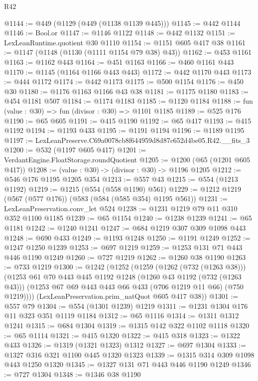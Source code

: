 \begin{lexlean}{R42}
\begin{coremodule}
@1144 := @449 (@1129 (@449 (@1138 @1139 @445)))
@1145 := @442 @1144
@1146 := Bool.or
@1147 := @1146 @1122
@1148 := @442 @1132
@1151 := LexLeanRuntime.quotient @30 @1110
@1154 := @1151 @605 @417 @38
@1161 := @1147 (@1148 (@1130 (@1111 @1154 @79 @38) @43))
@1162 := @453 @1161
@1163 := @1162 @443
@1164 := @451 @1163
@1166 := @460 @1161 @443
@1170 := @1145 (@1164 @1166 @443 @443)
@1172 := @442 @1170 @443
@1173 := @444 @1172
@1174 := @442 @1173
@1175 := @500 @1154
@1176 := @450 @30
@1180 := @1176 @1163 @1166 @43 @38
@1181 := @1175 @1180
@1183 := @454 @1181 @507
@1184 := @1174 @1183
@1185 := @1120 @1184
@1188 := fun (value : @30) => fun (divisor : @30) => @1101 @1185
@1189 := @525 @176
@1190 := @65 @605
@1191 := @415 @1190
@1192 := @65 @417
@1193 := @415 @1192
@1194 := @1193 @433
@1195 := @1191 @1194
@1196 := @1189 @1195
@1197 := LexLeanPreserve.C69a0078cb8f644959d8d87c652d4be05.R42.__fits_3
@1200 := @532 (@1197 @605 @417)
@1201 := VerdantEngine.FloatStorage.roundQuotient
@1205 := @1200 (@65 (@1201 @605 @417))
@1208 := (value : @30) -> (divisor : @30) -> @1196 @1205
@1212 := @546 @176 @1195 @1205 @354
@1213 := @557 @43
@1215 := @554 (@1213 @1192)
@1219 := @1215 (@554 (@558 @1190) @561)
@1229 := @1212 @1219 (@567 (@577 @176)) (@583 (@584 (@585 @354) @1195 @561))
@1231 := LexLeanPreservation.conv_let @524
@1238 := @1231 @1219 @79 @11 @310 @352 @1100 @1185
@1239 := @65 @1154
@1240 := @1238 @1239
@1241 := @65 @1181
@1242 := @1240 @1241
@1247 := @684 @1219 @307 @309 @1098 @443
@1248 := @690 @433
@1249 := @1193 @1248
@1250 := @1191 @1249
@1252 := @1247 @1250 @1239
@1253 := @697 @1219
@1259 := @1253 @131 @71 @443 @446 @1190 @1249
@1260 := @727 @1219
@1262 := @1260 @38 @1190
@1263 := @733 @1219
@1300 := @1242
    (@1252
      (@1259
        (@1262 (@732 (@1263 @38)))
        (@1253
          @61
          @70
          @443
          @445
          @1192
          @1248
          (@1260 @43 @1192 (@732 (@1263 @43)))
          (@1253 @67 @69 @443 @443 @66 @433 (@706 @1219 @11 @66) (@750 @1219))))
      (LexLeanPreservation.prim_natQuot @605 @417 @38))
@1301 := @557 @79
@1304 := @554 (@1301 @1239) @1219
@1311 := @1231 @1304 @176 @11 @323 @351 @1119 @1184
@1312 := @65 @1116
@1314 := @1311 @1312 @1241
@1315 := @684 @1304
@1319 := @1315 @142 @322 @1102 @1118
@1320 := @65 @1114
@1321 := @415 @1320
@1322 := @415 @318
@1323 := @1322 @433
@1326 := @1319 (@1321 @1323) @1312
@1327 := @697 @1304
@1333 := @1327 @316 @321 @1100 @445 @1320 @1323
@1339 := @1315 @314 @309 @1098 @443 @1250 @1320
@1345 := @1327 @131 @71 @443 @446 @1190 @1249
@1346 := @727 @1304
@1348 := @1346 @38 @1190

\end{coremodule}
\end{lexlean}
